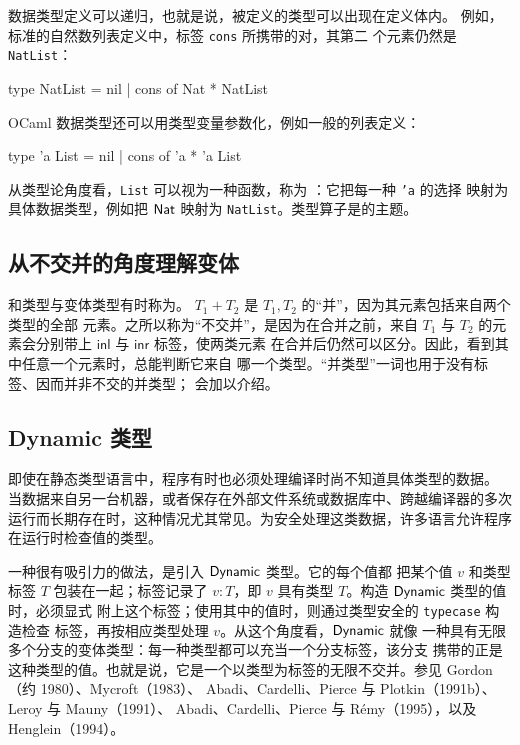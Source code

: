 \begin{enumerate}
    数据类型定义可以递归，也就是说，被定义的类型可以出现在定义体内。
    例如，标准的自然数列表定义中，标签 \texttt{cons} 所携带的对，其第二
    个元素仍然是 \texttt{NatList}：
    \begin{taplocamlcode}
type NatList = nil
             | cons of Nat * NatList
    \end{taplocamlcode}

    OCaml 数据类型还可以用类型变量参数化，例如一般的列表定义：
    \begin{taplocamlcode}
type 'a List = nil
             | cons of 'a * 'a List
    \end{taplocamlcode}
    从类型论角度看，\texttt{List} 可以视为一种函数，称为
    ：它把每一种 \texttt{'a} 的选择
    映射为具体数据类型，例如把 \(\mathsf{Nat}\) 映射为
    \texttt{NatList}。类型算子是的主题。
\end{enumerate}

\subsection*{从不交并的角度理解变体}

和类型与变体类型有时称为。
\(T_1+T_2\) 是 \(T_1,T_2\) 的“并”，因为其元素包括来自两个类型的全部
元素。之所以称为“不交并”，是因为在合并之前，来自 \(T_1\) 与 \(T_2\)
的元素会分别带上 \(\mathsf{inl}\) 与 \(\mathsf{inr}\) 标签，使两类元素
在合并后仍然可以区分。因此，看到其中任意一个元素时，总能判断它来自
哪一个类型。“并类型”一词也用于没有标签、因而并非不交的并类型；
 会加以介绍。

\subsection*{Dynamic 类型}

即使在静态类型语言中，程序有时也必须处理编译时尚不知道具体类型的数据。
当数据来自另一台机器，或者保存在外部文件系统或数据库中、跨越编译器的多次
运行而长期存在时，这种情况尤其常见。为安全处理这类数据，许多语言允许程序
在运行时检查值的类型。

一种很有吸引力的做法，是引入 \(\mathsf{Dynamic}\) 类型。它的每个值都
把某个值 \(v\) 和类型标签 \(T\) 包装在一起；标签记录了 \(v:T\)，即
\(v\) 具有类型 \(T\)。构造 \(\mathsf{Dynamic}\) 类型的值时，必须显式
附上这个标签；使用其中的值时，则通过类型安全的 \texttt{typecase} 构造检查
标签，再按相应类型处理 \(v\)。从这个角度看，\(\mathsf{Dynamic}\) 就像
一种具有无限多个分支的变体类型：每一种类型都可以充当一个分支标签，该分支
携带的正是这种类型的值。也就是说，它是一个以类型为标签的无限不交并。参见
Gordon（约 1980）、Mycroft（1983）、
Abadi、Cardelli、Pierce 与 Plotkin（1991b）、Leroy 与 Mauny（1991）、
Abadi、Cardelli、Pierce 与 Rémy（1995），以及 Henglein（1994）。

